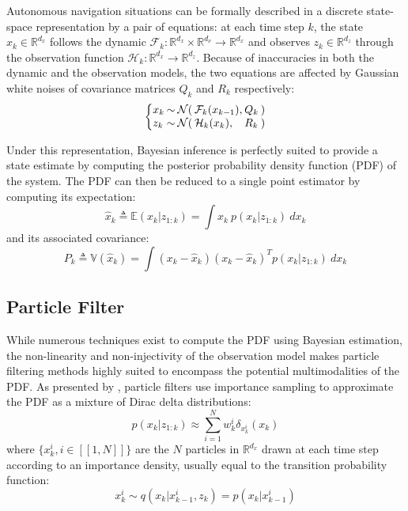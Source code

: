 \documentclass[conference]{IEEEtran}
\begin{document}
Autonomous navigation situations can be formally described in a discrete state-space representation by a pair of equations: at each time step $k$, the state $x_k\in\mathbb{R}^{d_x}$ follows the dynamic $\mathcal{F}_k:\mathbb{R}^{d_x}\times\mathbb{R}^{d_\nu}\to\mathbb{R}^{d_x}$ and observes $z_k\in\mathbb{R}^{d_z}$ through the observation function $\mathcal{H}_k:\mathbb{R}^{d_x}\to\mathbb{R}^{d_z}$. Because of inaccuracies in both the dynamic and the observation models, the two equations are affected by Gaussian white noises of covariance matrices $Q_k$ and $R_k$ respectively:
\begin{equation}
\setlength\arraycolsep{1pt}
\left\{\begin{matrix*}[l]
x_k&\sim&\mathcal{N}(&\mathcal{F}_k(x_{k-1}),&Q_k&)\\
z_k&\sim&\mathcal{N}(&\mathcal{H}_k(x_k),&R_k&)
\end{matrix*}\right.\label{eq:navigation equations}
\end{equation}

Under this representation, Bayesian inference is perfectly suited to provide a state estimate by computing the posterior probability density function (PDF) of the system. The PDF can then be reduced to a single point estimator by computing its expectation:
\begin{equation}
\textstyle \hat{x}_k\triangleq\mathbb{E}(x_k|z_{1:k})=\int{x_k\:p(x_k|z_{1:k})\:dx_k}\label{eq:expectation}
\end{equation}
and its associated covariance:
\begin{equation}
\textstyle P_k\triangleq\mathbb{V}(\hat{x}_k)=\int{(x_k-\hat{x}_k)(x_k-\hat{x}_k)^Tp(x_k|z_{1:k})\:dx_k}
\end{equation}

\subsection{Particle Filter}\label{sec:PF}

While numerous techniques exist to compute the PDF using Bayesian estimation, the non-linearity and non-injectivity of the observation model makes particle filtering methods highly suited to encompass the potential multimodalities of the PDF. As presented by \cite{bib:tuto}, particle filters use importance sampling to approximate the PDF as a mixture of Dirac delta distributions:
\begin{equation}
\textstyle p(x_k|z_{1:k})\approx\sum_{i=1}^Nw_k^i\delta_{x_k^i}(x_k)
\end{equation}
where $\{x_k^i,i\in [\![1,N]\!]\}$ are the $N$ particles in $\mathbb{R}^{d_x}$ drawn at each time step according to an importance density, usually equal to the transition probability function:
\begin{equation}
x_k^i\sim q(x_k|x_{k-1}^i,z_k)=p(x_k|x_{k-1}^i)
\end{equation}
\end{document}
